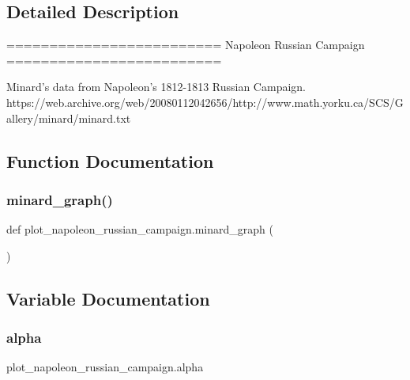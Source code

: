 \subsection{Detailed Description}
\begin{DoxyVerb}=========================
Napoleon Russian Campaign
=========================

Minard's data from Napoleon's 1812-1813  Russian Campaign.
https://web.archive.org/web/20080112042656/http://www.math.yorku.ca/SCS/Gallery/minard/minard.txt
\end{DoxyVerb}
 

\subsection{Function Documentation}
\mbox{\label{namespaceplot__napoleon__russian__campaign_a2e50d97fac020124042e79da19b10162}} 
\subsubsection{\texorpdfstring{minard\+\_\+graph()}{minard\_graph()}}
{\footnotesize\ttfamily def plot\+\_\+napoleon\+\_\+russian\+\_\+campaign.\+minard\+\_\+graph (\begin{DoxyParamCaption}{ }\end{DoxyParamCaption})}



\subsection{Variable Documentation}
\mbox{\label{namespaceplot__napoleon__russian__campaign_a371bbe259b7ffb273a69542d2803548b}} 
\subsubsection{\texorpdfstring{alpha}{alpha}}
{\footnotesize\ttfamily plot\+\_\+napoleon\+\_\+russian\+\_\+campaign.\+alpha}

